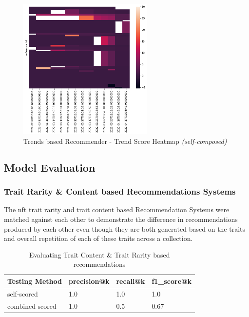 \begin{figure}[h!]
\centering
\includegraphics[width=0.6\textwidth]{images/Testing/trends/trends-heatmap-30.png}
\caption{Trends based Recommender - Trend Score Heatmap \textit{(self-composed)}}
\label{fig:trends-recsys-heatmap30}
\end{figure}



\subsection{Model Evaluation}

\subsubsection{Trait Rarity \& Content based Recommendations Systems}


The \gls{nft} trait rarity and trait content based Recommendation Systems were matched against each other to demonstrate the difference in recommendations produced by each other even though they are both generated based on the traits and overall repetition of each of these traits across a collection.

\begin{table}[h!]
\centering
\caption{Evaluating Trait Content \& Trait Rarity based recommendations}
\begin{tabular}{|l|l|l|l|}
\hline
\textbf{Testing Method} & \textbf{precision@k} &
\textbf{recall@k} & \textbf{f1\_score@k} \\
\hline
self-scored & 1.0 & 1.0 & 1.0 \\
\hline
combined-scored & 1.0 & 0.5 & 0.67\\
\hline
\end{tabular}
\end{table}

